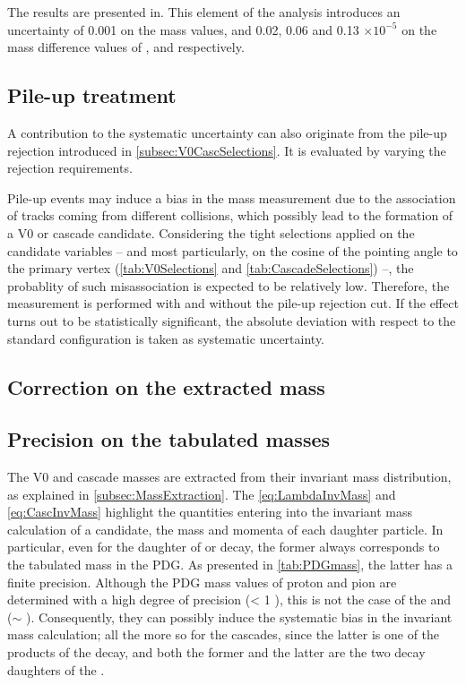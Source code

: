 The results are presented in. This element of the analysis introduces an uncertainty of
0.001 \mmass on the mass values, and 0.02, 0.06 and 0.13 $\times 10^{-5}$ on the mass difference values of \rmLambda, \rmXi and \rmOmega respectively.

\subsection{Pile-up treatment}

A contribution to the systematic uncertainty can also originate from the pile-up rejection introduced in \Sec\ref{subsec:V0CascSelections}. It is evaluated by varying the rejection requirements. 

Pile-up events may induce a bias in the mass measurement due to the association of tracks coming from different collisions, which possibly lead to the formation of a V0 or cascade candidate. Considering the tight selections applied on the candidate variables -- and most particularly, on the cosine of the pointing angle to the primary vertex (\tabs\ref{tab:V0Selections} and \ref{tab:CascadeSelections}) --, the probablity of such misassociation is expected to be relatively low. Therefore, the measurement is performed with and without the pile-up rejection cut. If the effect turns out to be statistically significant, the absolute deviation with respect to the standard configuration is taken as systematic uncertainty.

\subsection{Correction on the extracted mass}

\subsection{Precision on the tabulated masses}

The V0 and cascade masses are extracted from their invariant mass distribution, as explained in \Sec\ref{subsec:MassExtraction}. The \eq\ref{eq:LambdaInvMass} and \ref{eq:CascInvMass} highlight the quantities entering into the invariant mass calculation of a candidate, \ie the mass and momenta of each daughter particle. In particular, even for the \rmLambdaPM daughter of \rmXiPM or \rmOmegaPM decay, the former always corresponds to the tabulated mass in the PDG. As presented in \tab\ref{tab:PDGmass}, the latter has a finite precision. Although the PDG mass values of proton and pion are determined with a high degree of precision (\sigmaPDG < 1 \kmass), this is not the case of the \rmKPM and \rmLambdaPM (\sigmaPDG $\sim$ \kmass). Consequently, they can possibly induce the systematic bias in the invariant mass calculation; all the more so for the cascades, since the latter is one of the products of the \rmXi decay, and both the former and the latter are the two decay daughters of the \rmOmega. 


